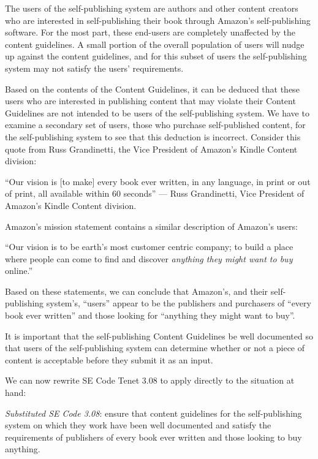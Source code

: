 \documentclass[11pt]{article}
\begin{document}
\begin{multicols}{2}
The users of the self-publishing system are authors and other content creators who are interested in self-publishing their book through Amazon's self-publishing software.  For the most part, these end-users are completely unaffected by the content guidelines.  A small portion of the overall population of users will nudge up against the content guidelines, and for this subset of users the self-publishing system may not satisfy the users' requirements.

Based on the contents of the Content Guidelines, it can be deduced that these users who are interested in publishing content that may violate their Content Guidelines are not intended to be users of the self-publishing system.  We have to examine a secondary set of users, those who purchase self-published content, for the self-publishing system to see that this deduction is incorrect.  Consider this quote from Russ Grandinetti, the Vice President of Amazon's Kindle Content division:

``Our vision is [to make] every book ever written, in any language, in print or out of print, all available within 60 seconds'' --- Russ Grandinetti, Vice President of Amazon's Kindle Content division. \cite{LATimesRussQuote}

Amazon's mission statement contains a similar description of Amazon's users:

``Our vision is to be earth's most customer centric company; to build a place where people can come to find and discover \emph{anything they might want to buy} online.'' \cite[Emphasis Mine]{AmazonIRFAQ}

Based on these statements, we can conclude that Amazon's, and their self-publishing system's, ``users'' appear to be the publishers and purchasers of ``every book ever written'' and those looking for ``anything they might want to buy''.

It is important that the self-publishing Content Guidelines be well documented so that users of the self-publishing system can determine whether or not a piece of content is acceptable before they submit it as an input.

We can now rewrite SE Code Tenet 3.08 to apply directly to the situation at hand:

\emph{Substituted SE Code 3.08}: ensure that content guidelines for the self-publishing system on which they work have been well documented and satisfy the requirements of publishers of every book ever written and those looking to buy anything.


\end{multicols}
\end{document}

